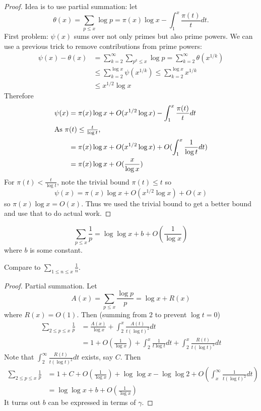 \documentclass[a4paper]{article}
\theoremstyle{definition}
\begin{document}
\begin{proof}
  Idea is to use partial summation: let
  \[
    \theta(x)
    = \sum_{p \leq x} \log p
    = \pi(x) \log x - \int_1^x \frac{\pi(t)}{t} dt.
  \]
  First problem: \(\psi(x)\) sums over not only primes but also prime powers. We can use a previous trick to remove contributions from prime powers:
  \begin{align*}
    \psi(x) - \theta(x)
    &= \sum_{k = 2}^\infty \sum_{p^k \leq x} \log p
    = \sum_{k = 2}^\infty \theta(x^{1/k}) \\
    &\leq \sum_{k = 2}^{\log x} \psi(x^{1/k})
    \leq \sum_{k = 2}^{\log x} x^{1/k} \\
    &\leq x^{1/2} \log x
  \end{align*}
  Therefore
  \begin{align*}
    \psi(x)
    &= \pi(x) \log x + O(x^{1/2} \log x) - \int_1^x \frac{\pi(t)}{t} dt \\
    \intertext{As \(\pi(t) \leq \frac{t}{\log t}\),}
    &= \pi(x) \log x + O(x^{1/2} \log x) + O(\int_1^x \frac{1}{\log t} dt) \\
    &= \pi(x) \log x + O(\frac{x}{\log x})
  \end{align*}
  For \(\pi(t) < \frac{t}{\log t}\), note the trivial bound \(\pi(t) \leq t\) so
  \[
    \psi(x) = \pi(x) \log x + O(x^{1/2} \log x) + O(x)
  \]
  so \(\pi(x)\log x = O(x)\). Thus we used the trivial bound to get a better bound and use that to do actual work.
\end{proof}

\begin{lemma}
  \[
    \sum_{p \leq x} \frac{1}{p} = \log \log x + b + O(\frac{1}{\log x})
  \]
  where \(b\) is some constant.
\end{lemma}

Compare to \(\sum_{1 \leq n \leq x} \frac{1}{n}\).

\begin{proof}
  Partial summation. Let
  \[
    A(x) = \sum_{p \leq x} \frac{\log p}{p} = \log x + R(x)
  \]
  where \(R(x) = O(1)\). Then (summing from \(2\) to prevent \(\log t = 0\))
  \begin{align*}
    \sum_{2 \leq p \leq x} \frac{1}{p}
    &= \frac{A(x)}{\log x} + \int_2^x \frac{A(t)}{t (\log t)^2} dt \\
    &= 1 + O(\frac{1}{\log x}) + \int_2^x \frac{1}{t \log t} dt + \int_2^x \frac{R(t)}{t(\log t)^2} dt
  \end{align*}
  Note that \(\int_2^\infty \frac{R(t)}{t (\log t)^2} dt\) exists, say \(C\). Then
  \begin{align*}
    \sum_{2 \leq p \leq x} \frac{1}{p}
    &= 1 + C + O(\frac{1}{\log x}) + \log \log x - \log \log 2 + O(\int_x^\infty \frac{1}{t (\log t)^2} dt) \\
    &= \log \log x + b + O(\frac{1}{\log x})
  \end{align*}
  It turns out \(b\) can be expressed in terms of \(\gamma\).
\end{proof}
\end{document}
